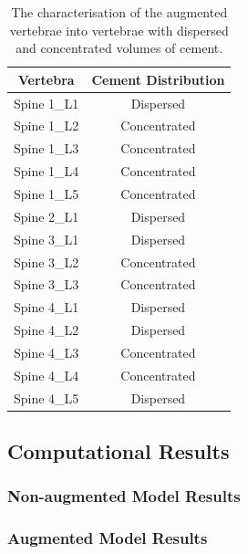 \begin{table}[h!]
	\caption{The characterisation of the augmented vertebrae into vertebrae with dispersed and concentrated volumes of cement.}
	\label{tab:conc_disp}
	\centering
	\begin{tabular}{c|c}
    Vertebra & Cement Distribution \\
    \hline
    \hline

    Spine 1\_L1 & Dispersed \\
    Spine 1\_L2 & Concentrated\\
    Spine 1\_L3 & Concentrated\\
    Spine 1\_L4 & Concentrated\\
    Spine 1\_L5 & Concentrated\\
    Spine 2\_L1 & Dispersed \\
    Spine 3\_L1 & Dispersed \\
    Spine 3\_L2 & Concentrated\\
    Spine 3\_L3 & Concentrated\\
    Spine 4\_L1 & Dispersed \\
    Spine 4\_L2 & Dispersed \\
    Spine 4\_L3 & Concentrated\\
    Spine 4\_L4 & Concentrated\\
    Spine 4\_L5 & Dispersed \\
    \hline
	\end{tabular}
\end{table}



\subsection{Computational Results}

\subsubsection{Non-augmented Model Results}

\subsubsection{Augmented Model Results}



















